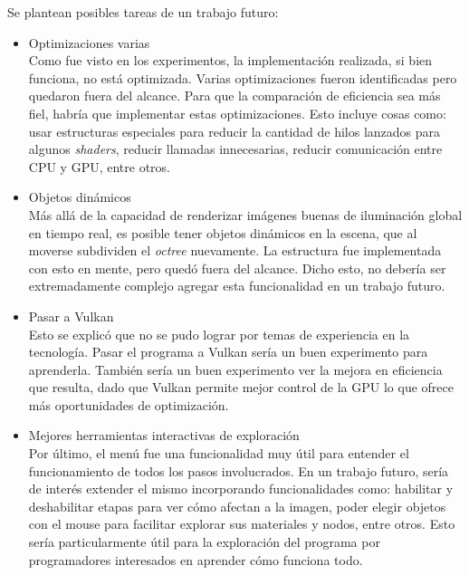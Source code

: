 Se plantean posibles tareas de un trabajo futuro:
\begin{itemize}
    \item Optimizaciones varias\\
        Como fue visto en los experimentos, la implementación realizada, si bien funciona, no está optimizada.
        Varias optimizaciones fueron identificadas pero quedaron fuera del alcance.
        Para que la comparación de eficiencia sea más fiel, habría que implementar estas optimizaciones.
        Esto incluye cosas como: usar estructuras especiales para reducir la cantidad de hilos lanzados para algunos \textit{shaders}, reducir llamadas innecesarias, reducir comunicación entre CPU y GPU, entre otros.
    \item Objetos dinámicos\\
        Más allá de la capacidad de renderizar imágenes buenas de iluminación global en tiempo real, es posible tener objetos dinámicos en la escena, que al moverse subdividen el \textit{octree} nuevamente.
        La estructura fue implementada con esto en mente, pero quedó fuera del alcance.
        Dicho esto, no debería ser extremadamente complejo agregar esta funcionalidad en un trabajo futuro.
    \item Pasar a Vulkan\\
        Esto se explicó que no se pudo lograr por temas de experiencia en la tecnología.
        Pasar el programa a Vulkan sería un buen experimento para aprenderla.
        También sería un buen experimento ver la mejora en eficiencia que resulta, dado que Vulkan permite mejor control de la GPU lo que ofrece más oportunidades de optimización.
    \item Mejores herramientas interactivas de exploración\\
        Por último, el menú fue una funcionalidad muy útil para entender el funcionamiento de todos los pasos involucrados.
        En un trabajo futuro, sería de interés extender el mismo incorporando funcionalidades como: habilitar y deshabilitar etapas para ver cómo afectan a la imagen, poder elegir objetos con el mouse para facilitar explorar sus materiales y nodos, entre otros.
        Esto sería particularmente útil para la exploración del programa por programadores interesados en aprender cómo funciona todo.
\end{itemize}
